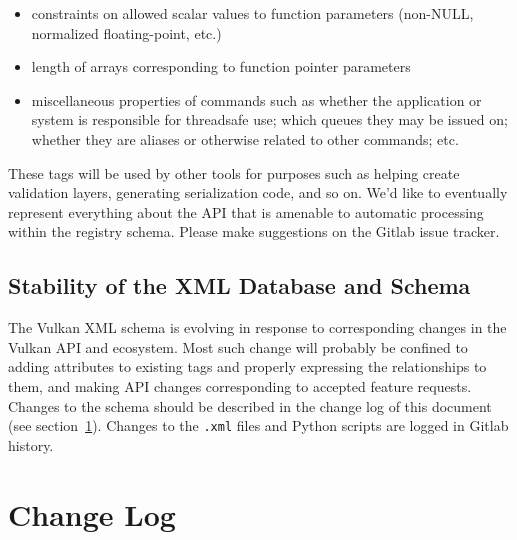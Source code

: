 \documentclass{article}
\def\code#1{{\tt #1}}
\begin{document}
\begin{itemize}
\item constraints on allowed scalar values to function parameters (non-NULL,
      normalized floating-point, etc.)
\item length of arrays corresponding to function pointer parameters
\item miscellaneous properties of commands such as whether the application
      or system is responsible for threadsafe use; which queues they may be
      issued on; whether they are aliases or otherwise related to other
      commands; etc.
\end{itemize}

These tags will be used by other tools for purposes such as helping create
validation layers, generating serialization code, and so on. We'd like to
eventually represent everything about the API that is amenable to automatic
processing within the registry schema. Please make suggestions on the Gitlab
issue tracker.


\subsection{Stability of the XML Database and Schema}
\label{general:stability}

The Vulkan XML schema is evolving in response to corresponding
changes in the Vulkan API and ecosystem. Most such change will probably be
confined to adding attributes to existing tags and properly expressing the
relationships to them, and making API changes corresponding to accepted
feature requests. Changes to the schema should be described in the change
log of this document (see section~\ref{changelog}). Changes to the
\code{.xml} files and Python scripts are logged in Gitlab history.


\section{Change Log}
\label{changelog}
\end{document}
